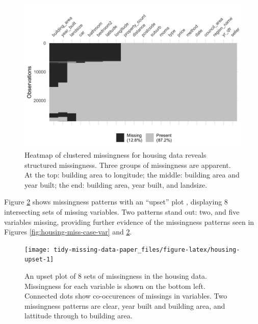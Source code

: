 \documentclass[
]{jss}
\begin{document}
\begin{CodeChunk}
\begin{figure}

{\centering \includegraphics[width=0.85\linewidth]{tidy-missing-data-paper_files/figure-latex/applic-vis-miss-1} 

}

\caption[Heatmap of clustered missingness for housing data reveals structured missingness]{Heatmap of clustered missingness for housing data reveals structured missingness. Three groups of missingness are apparent. At the top: building area to longitude; the middle: building area and year built; the end: building area, year built, and landsize.}\label{fig:applic-vis-miss}
\end{figure}
\end{CodeChunk}

Figure \ref{fig:housing-upset} shows missingness patterns with an ``upset'' plot \citep{Conway2017}, displaying 8 intersecting sets of missing variables. Two patterns stand out: two, and five variables missing, providing further evidence of the missingness patterns seen in Figures \ref{fig:housing-miss-case-var} and \ref{fig:housing-upset}.

\begin{CodeChunk}
\begin{figure}

{\centering \texttt{[image: tidy-missing-data-paper\_files/figure-latex/housing-upset-1]} 

}

\caption[An upset plot of 8 sets of missingness in the housing data]{An upset plot of 8 sets of missingness in the housing data. Missingness for each variable is shown on the bottom left. Connected dots show co-occurences of missings in variables. Two missingness patterns are clear, year built and building area, and lattitude through to building area.}\label{fig:housing-upset}
\end{figure}
\end{CodeChunk}
\end{document}
